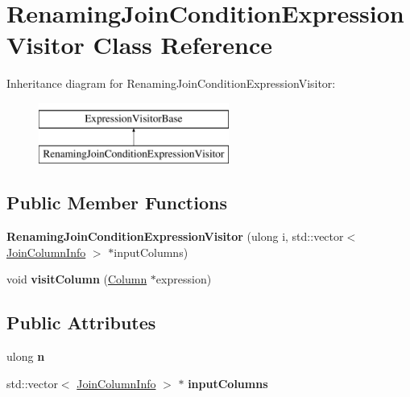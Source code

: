 \hypertarget{class_renaming_join_condition_expression_visitor}{\section{Renaming\+Join\+Condition\+Expression\+Visitor Class Reference}
\label{class_renaming_join_condition_expression_visitor}
}
Inheritance diagram for Renaming\+Join\+Condition\+Expression\+Visitor\+:\begin{figure}[H]
\begin{center}
\leavevmode
\includegraphics[height=2.000000cm]{class_renaming_join_condition_expression_visitor}
\end{center}
\end{figure}
\subsection*{Public Member Functions}
\begin{DoxyCompactItemize}
\item 
\hypertarget{class_renaming_join_condition_expression_visitor_a2b0669f3664fd3b9170e431bfcde9851}{{\bfseries Renaming\+Join\+Condition\+Expression\+Visitor} (ulong i, std\+::vector$<$ \hyperlink{class_join_column_info}{Join\+Column\+Info} $>$ $\ast$input\+Columns)}\label{class_renaming_join_condition_expression_visitor_a2b0669f3664fd3b9170e431bfcde9851}

\item 
\hypertarget{class_renaming_join_condition_expression_visitor_aa55184f591960115d4e11eff4be0d3d5}{void {\bfseries visit\+Column} (\hyperlink{class_column}{Column} $\ast$expression)}\label{class_renaming_join_condition_expression_visitor_aa55184f591960115d4e11eff4be0d3d5}

\end{DoxyCompactItemize}
\subsection*{Public Attributes}
\begin{DoxyCompactItemize}
\item 
\hypertarget{class_renaming_join_condition_expression_visitor_aa9eacf839bdb9a30653d5cae0448532b}{ulong {\bfseries n}}\label{class_renaming_join_condition_expression_visitor_aa9eacf839bdb9a30653d5cae0448532b}

\item 
\hypertarget{class_renaming_join_condition_expression_visitor_a8b8dceeedbf7c4d3aac3761ce3a4c302}{std\+::vector$<$ \hyperlink{class_join_column_info}{Join\+Column\+Info} $>$ $\ast$ {\bfseries input\+Columns}}\label{class_renaming_join_condition_expression_visitor_a8b8dceeedbf7c4d3aac3761ce3a4c302}

\end{DoxyCompactItemize}


